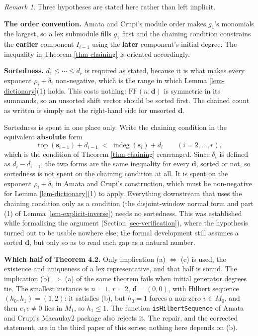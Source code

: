 \documentclass[11pt, a4paper, abstract=yes]{scrartcl}
\theoremstyle{definition}
\theoremstyle{remark}
\newtheorem{remark}[definition]{Remark}
\theoremstyle{plain}
\newcommand{\vek}[1]{\boldsymbol{#1}}
\newcommand{\indeg}{\operatorname{indeg}}
\newcommand{\tp}{\operatorname{top}}
\begin{document}
\begin{remark}
Three hypotheses are stated here rather than left implicit.

\textbf{The order convention.} Amata and Crupi's module order makes \(g_1\)'s monomials the largest, so a
lex submodule fills \(g_1\) first and the chaining condition constrains the \textbf{earlier} component
\(I_{i-1}\) using the \textbf{later} component's initial degree. The inequality in Theorem \ref{thm-chaining}
is oriented accordingly.

\textbf{Sortedness.} \(d_1\le\cdots\le d_r\) is required as stated, because it is what makes every exponent
\(\rho_i+\delta_i\) non-negative, which is the range in which Lemma \ref{lem-dictionary}(1) holds. This
costs nothing: \(\mathrm{FF}(n;\vek d)\) is symmetric in its summands, so an unsorted shift vector should be
sorted first. The chained count as written is simply not the right-hand side for unsorted \(\vek d\).

Sortedness is spent in one place only.
Write the chaining condition in the equivalent \textbf{absolute} form
\begin{equation}\label{eq:chaining-absolute}
  \tp(\vek s_{i-1})+d_{i-1}\;<\;\indeg(\vek s_i)+d_i \qquad(i=2,\dots,r),
\end{equation}
which is the condition of Theorem \ref{thm-chaining} rearranged. Since \(\delta_i\) is defined as
\(d_i-d_{i-1}\), the two forms are the same inequality for every \(\vek d\), sorted or not, so
sortedness is not spent on the chaining condition at all. It is spent on the exponent
\(\rho_i+\delta_i\) in Amata and Crupi's construction, which must be non-negative for
Lemma \ref{lem-dictionary}(1) to apply. Everything downstream that uses the chaining condition only as
a condition (the disjoint-window normal form and part (1) of Lemma
\ref{lem-explicit-inverse}) needs no sortedness. This was established while formalising the argument
(Section \ref{sec-verification}), where the hypothesis turned out to be usable nowhere else; the
formal development still assumes a sorted \(\vek d\), but only so as to read each gap as a natural
number.

\textbf{Which half of Theorem 4.2.} Only implication (a) \(\Leftrightarrow\) (c) is used, the existence
and uniqueness of a lex representative, and that half is sound. The implication (b) \(\Rightarrow\) (a) of the same
theorem fails when initial generator degrees tie. The smallest instance is \(n=1\), \(r=2\),
\(\vek d=(0,0)\), with Hilbert sequence \((h_0,h_1)=(1,2)\): it satisfies (b), but \(h_0=1\) forces a
non-zero \(v\in M_0\), and then \(e_1v\ne0\) lies in \(M_1\), so \(h_1\le1\). The function
\texttt{isHilbertSequence} of Amata and Crupi's Macaulay2 package \autocite{AmataCrupi2021} also rejects it.
The repair, and the corrected statement, are in the third paper of this series; nothing here
depends on (b).
\label{rem-sorted}
\end{remark}
\end{document}
